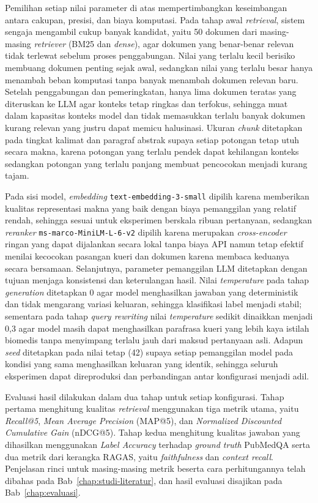 Pemilihan setiap nilai parameter di atas mempertimbangkan keseimbangan antara cakupan, presisi, dan biaya komputasi. Pada tahap awal \textit{retrieval}, sistem sengaja mengambil cukup banyak kandidat, yaitu 50 dokumen dari masing-masing \textit{retriever} (BM25 dan \textit{dense}), agar dokumen yang benar-benar relevan tidak terlewat sebelum proses penggabungan. Nilai yang terlalu kecil berisiko membuang dokumen penting sejak awal, sedangkan nilai yang terlalu besar hanya menambah beban komputasi tanpa banyak menambah dokumen relevan baru. Setelah penggabungan dan pemeringkatan, hanya lima dokumen teratas yang diteruskan ke LLM agar konteks tetap ringkas dan terfokus, sehingga muat dalam kapasitas konteks model dan tidak memasukkan terlalu banyak dokumen kurang relevan yang justru dapat memicu halusinasi. Ukuran \textit{chunk} ditetapkan pada tingkat kalimat dan paragraf abstrak supaya setiap potongan tetap utuh secara makna, karena potongan yang terlalu pendek dapat kehilangan konteks sedangkan potongan yang terlalu panjang membuat pencocokan menjadi kurang tajam.

Pada sisi model, \textit{embedding} \texttt{text-embedding-3-small} dipilih karena memberikan kualitas representasi makna yang baik dengan biaya pemanggilan yang relatif rendah, sehingga sesuai untuk eksperimen berskala ribuan pertanyaan, sedangkan \textit{reranker} \texttt{ms-marco-MiniLM-L-6-v2} dipilih karena merupakan \textit{cross-encoder} ringan yang dapat dijalankan secara lokal tanpa biaya API namun tetap efektif menilai kecocokan pasangan kueri dan dokumen karena membaca keduanya secara bersamaan. Selanjutnya, parameter pemanggilan LLM ditetapkan dengan tujuan menjaga konsistensi dan keterulangan hasil. Nilai \textit{temperature} pada tahap \textit{generation} ditetapkan 0 agar model menghasilkan jawaban yang deterministik dan tidak mengarang variasi keluaran, sehingga klasifikasi label menjadi stabil; sementara pada tahap \textit{query rewriting} nilai \textit{temperature} sedikit dinaikkan menjadi 0{,}3 agar model masih dapat menghasilkan parafrasa kueri yang lebih kaya istilah biomedis tanpa menyimpang terlalu jauh dari maksud pertanyaan asli. Adapun \textit{seed} ditetapkan pada nilai tetap (42) supaya setiap pemanggilan model pada kondisi yang sama menghasilkan keluaran yang identik, sehingga seluruh eksperimen dapat direproduksi dan perbandingan antar konfigurasi menjadi adil.

Evaluasi hasil dilakukan dalam dua tahap untuk setiap konfigurasi. Tahap pertama menghitung kualitas \textit{retrieval} menggunakan tiga metrik utama, yaitu \textit{Recall@5}, \textit{Mean Average Precision} (MAP@5), dan \textit{Normalized Discounted Cumulative Gain} (nDCG@5). Tahap kedua menghitung kualitas jawaban yang dihasilkan menggunakan \textit{Label Accuracy} terhadap \textit{ground truth} PubMedQA serta dua metrik dari kerangka RAGAS, yaitu \textit{faithfulness} dan \textit{context recall}. Penjelasan rinci untuk masing-masing metrik beserta cara perhitungannya telah dibahas pada Bab~\ref{chap:studi-literatur}, dan hasil evaluasi disajikan pada Bab~\ref{chap:evaluasi}.
